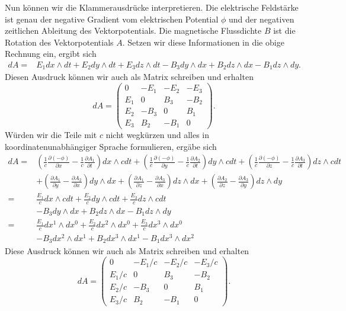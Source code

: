 Nun können wir die Klammerausdrücke interpretieren.
Die elektrische Feldstärke ist genau der negative Gradient vom elektrischen Potential $\phi$ und der negativen zeitlichen Ableitung des Vektorpotentials.
Die magnetische Flussdichte $B$ ist die Rotation des Vektorpotentials $A$.
Setzen wir diese Informationen in die obige Rechnung ein, ergibt sich
\begin{align*}
	dA = 
	& E_1 dx \wedge dt + E_2 dy\wedge dt + E_3 dz\wedge dt - B_3 dy \wedge dx + B_2 dz \wedge dx - B_1 dz\wedge dy.
\end{align*}
Diesen Ausdruck können wir auch als Matrix schreiben und erhalten
\begin{equation*}
	dA = \begin{pmatrix}
		0 & -E_1 & -E_2 & -E_3 \\ E_1 & 0 & B_3 & -B_2 \\ E_2 & -B_3 & 0 & B_1 \\ E_3 & B_2 & -B_1 & 0 
	\end{pmatrix}.
\end{equation*}
Würden wir die Teile mit $c$ nicht wegkürzen und alles in koordinatenunabhängiger Sprache formulieren, ergäbe sich
\begin{align*}
	dA = 
	& \left(\frac{1}{c}\frac{\partial (-\phi)}{\partial x}-\frac{1}{c}\frac{\partial A_1}{\partial t}\right) dx \wedge cdt +
	\left(\frac{1}{c}\frac{\partial (-\phi)}{\partial y}-\frac{1}{c}\frac{\partial A_2}{\partial t}\right) dy \wedge cdt +
	\left(\frac{1}{c}\frac{\partial (-\phi)}{\partial z}-\frac{1}{c}\frac{\partial A_3}{\partial t}\right) dz \wedge cdt\\
	& + \left(\frac{\partial A_1}{\partial y}-\frac{\partial A_2}{\partial x}\right) dy \wedge dx +
	\left(\frac{\partial A_1}{\partial z}-\frac{\partial A_3}{\partial x}\right) dz \wedge dx +
	\left(\frac{\partial A_2}{\partial z}-\frac{\partial A_3}{\partial y}\right) dz \wedge dy\\[2ex] = 
	& \frac{E_1}{c} dx \wedge cdt +
	\frac{E_2}{c} dy \wedge cdt +
	\frac{E_3}{c} dz \wedge cdt\\
	& - B_3 dy \wedge dx +
	B_2 dz \wedge dx -
	B_1 dz \wedge dy\\[2ex] =
	& \frac{E_1}{c} dx^1 \wedge dx^0 +
	\frac{E_2}{c} dx^2 \wedge dx^0 +
	\frac{E_3}{c} dx^3 \wedge dx^0\\
	& - B_3 dx^2 \wedge dx^1 +
	B_2 dx^3 \wedge dx^1 -
	B_1 dx^3 \wedge dx^2
\end{align*}
Diese Ausdruck können wir auch als Matrix schreiben und erhalten
\begin{equation*}
	dA = \begin{pmatrix}
		0 & -E_1/c & -E_2/c & -E_3/c \\ E_1/c & 0 & B_3 & -B_2 \\ E_2/c & -B_3 & 0 & B_1 \\ E_3/c & B_2 & -B_1 & 0 
	\end{pmatrix}.
\end{equation*}

